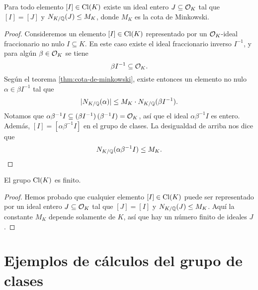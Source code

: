 \begin{lema}
  Para todo elemento $[I] \in \operatorname{Cl} (K)$ existe un ideal entero $J \subseteq \mathcal{O}_K$
  tal que $[I] = [J]$ y $N_{K/\mathbb{Q}} (J) \le M_K$, donde $M_K$ es la cota de
  Minkowski.

  \begin{proof}
    Consideremos un elemento $[I] \in \operatorname{Cl} (K)$ representado por un $\mathcal{O}_K$-ideal
    fraccionario no nulo $I \subseteq K$. En este caso existe el ideal
    fraccionario inverso $I^{-1}$, y para algún $\beta \in \mathcal{O}_K$ se tiene
    $$\beta I^{-1} \subseteq \mathcal{O}_K.$$
    Según el teorema \ref{thm:cota-de-minkowski}, existe entonces un elemento no
    nulo $\alpha \in \beta I^{-1}$ tal que
    $$|N_{K/\mathbb{Q}} (\alpha)| \le M_K\cdot N_{K/\mathbb{Q}} (\beta I^{-1}).$$
    Notamos que
    $\alpha \beta^{-1} I \subseteq (\beta I^{-1})\,(\beta^{-1} I) = \mathcal{O}_K$, así
    que el ideal $\alpha \beta^{-1} I$ es entero. Además,
    $[I] = [\alpha \beta^{-1} I]$ en el grupo de clases. La desigualdad de
    arriba nos dice que
    \[ N_{K/\mathbb{Q}} (\alpha \beta^{-1} I) \le M_K. \qedhere \]
  \end{proof}
\end{lema}

\begin{teorema}
  El grupo $\operatorname{Cl} (K)$ es finito.

  \begin{proof}
    Hemos probado que cualquier elemento $[I] \in \operatorname{Cl} (K)$ puede ser
    representado por un ideal entero $J \subseteq \mathcal{O}_K$ tal que $[J] = [I]$ y
    $N_{K/\mathbb{Q}} (J) \le M_K$. Aquí la constante $M_K$ depende solamente de $K$,
    así que hay un número finito de ideales $J$.
  \end{proof}
\end{teorema}


\section{Ejemplos de cálculos del grupo de clases}

